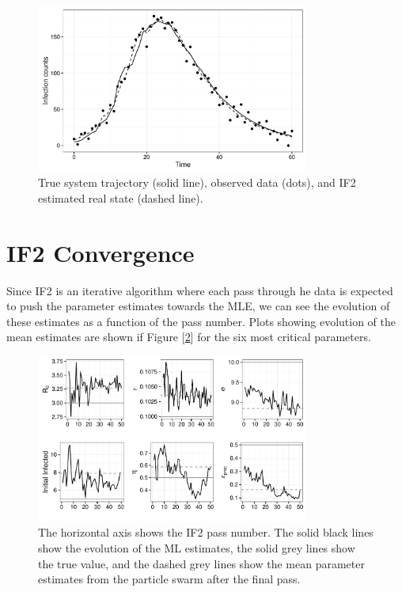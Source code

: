	\begin{figure}
        \centering
        \captionsetup{width=.8\linewidth}
        \includegraphics[width=0.8\textwidth]{./images/if2state.pdf}
        \caption{True system trajectory (solid line), observed data (dots), and IF2 estimated real state (dashed line). \label{if2state}}
    \end{figure}


\section{IF2 Convergence}

	Since IF2 is an iterative algorithm where each pass through he data is expected to push the parameter estimates towards the MLE, we can see the evolution of these estimates as a function of the pass number. Plots showing evolution of the mean estimates are shown if Figure [\ref{if2convergence}] for the six most critical parameters.

	\begin{figure}
        \centering
        \captionsetup{width=.8\linewidth}
        \includegraphics[width=0.8\textwidth]{./images/if2convergence.pdf}
        \caption{The horizontal axis shows the IF2 pass number. The solid black lines show the evolution of the ML estimates, the solid grey lines show the true value, and the dashed grey lines show the mean parameter estimates from the particle swarm after the final pass. \label{if2convergence}}
    \end{figure}

